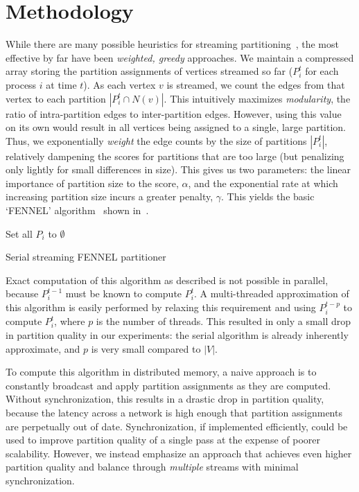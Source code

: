 \section{Methodology} \label{sec:meth}
While there are many possible heuristics for streaming partitioning~\cite{Stanton:2012:SGP:2339530.2339722}, the most effective by far have been \emph{weighted, greedy} approaches. We maintain a compressed array storing the partition assignments of vertices streamed so far ($P_i^t$ for each process $i$ at time $t$). As each vertex $v$ is streamed, we count the edges from that vertex to each partition $|P_i^t \cap N(v)|$. This intuitively maximizes \emph{modularity}, the ratio of intra-partition edges to inter-partition edges. However, using this value on its own would result in all vertices being assigned to a single, large partition. Thus, we exponentially \emph{weight} the edge counts by the size of partitions $|P_i^t|$, relatively dampening the scores for partitions that are too large (but penalizing only lightly for small differences in size). This gives us two parameters: the linear importance of partition size to the score, $\alpha$, and the exponential rate at which increasing partition size incurs a greater penalty, $\gamma$. This yields the basic `FENNEL' algorithm~\cite{tsourakakis2012fennel} shown in~.

\begin{algorithm}
 Set all $P_i$ to $\emptyset$\;
 \caption{Serial streaming FENNEL partitioner}
 \label{alg:fennel}
\end{algorithm}

Exact computation of this algorithm as described is not possible in parallel, because $P_i^{t-1}$ must be known to compute $P_i^t$. A multi-threaded approximation of this algorithm is easily performed by relaxing this requirement and using $P_i^{t-p}$ to compute $P_i^t$, where $p$ is the number of threads. This resulted in only a small drop in partition quality in our experiments: the serial algorithm is already inherently approximate, and $p$ is very small compared to $|V|$.

To compute this algorithm in distributed memory, a naive approach is to constantly broadcast and apply partition assignments as they are computed. Without synchronization, this results in a drastic drop in partition quality, because the latency across a network is high enough that partition assignments are perpetually out of date. Synchronization, if implemented efficiently, could be used to improve partition quality of a single pass at the expense of poorer scalability. However, we instead emphasize an approach that achieves even higher partition quality and balance through \emph{multiple} streams with minimal synchronization.

